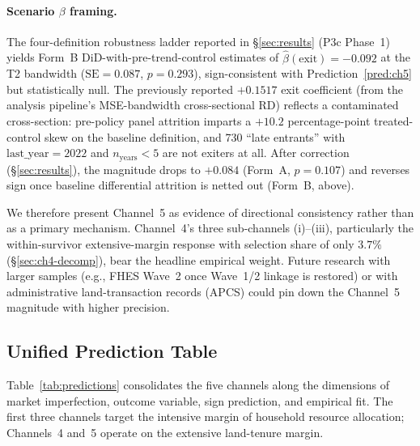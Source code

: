 \paragraph{Scenario $\beta$ framing.} The four-definition robustness ladder reported in \S\ref{sec:results} (P3c Phase~1) yields Form~B DiD-with-pre-trend-control estimates of $\hat\beta(\text{exit}) = -0.092$ at the T2 bandwidth ($\text{SE} = 0.087$, $p = 0.293$), sign-consistent with Prediction~\ref{pred:ch5} but statistically null. The previously reported $+0.1517$ exit coefficient (from the analysis pipeline's MSE-bandwidth cross-sectional RD) reflects a contaminated cross-section: pre-policy panel attrition imparts a $+10.2$ percentage-point treated-control skew on the baseline definition, and 730 ``late entrants'' with $\text{last\_year} = 2022$ and $n_{\text{years}} < 5$ are not exiters at all. After correction (\S\ref{sec:results}), the magnitude drops to $+0.084$ (Form~A, $p = 0.107$) and reverses sign once baseline differential attrition is netted out (Form~B, above).

We therefore present Channel~5 as evidence of directional consistency rather than as a primary mechanism. Channel~4's three sub-channels (i)--(iii), particularly the within-survivor extensive-margin response with selection share of only $3.7\%$ (\S\ref{sec:ch4-decomp}), bear the headline empirical weight. Future research with larger samples (e.g., FHES Wave~2 once Wave~1/2 linkage is restored) or with administrative land-transaction records (APCS) could pin down the Channel~5 magnitude with higher precision.

\subsection{Unified Prediction Table}
\label{sec:predictions}

Table~\ref{tab:predictions} consolidates the five channels along the dimensions of market imperfection, outcome variable, sign prediction, and empirical fit. The first three channels target the intensive margin of household resource allocation; Channels~4 and~5 operate on the extensive land-tenure margin.

